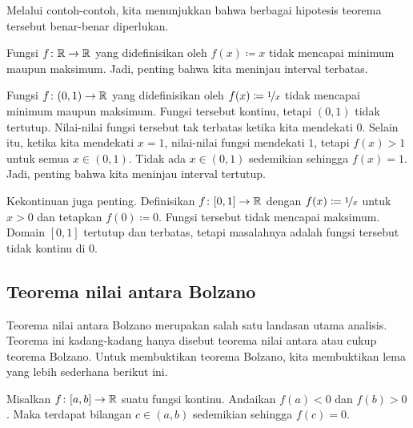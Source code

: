 Melalui contoh-contoh, kita menunjukkan bahwa berbagai hipotesis teorema tersebut
benar-benar diperlukan.

\begin{example}
Fungsi $f \colon {\mathbb{R}} \to {\mathbb{R}}$ yang didefinisikan oleh $f(x) \coloneqq x$
tidak mencapai minimum maupun maksimum.  Jadi, penting bahwa
kita meninjau interval terbatas.
\end{example}

\begin{example}
Fungsi $f \colon (0,1) \to {\mathbb{R}}$ yang didefinisikan oleh $f(x) \coloneqq \nicefrac{1}{x}$
tidak mencapai minimum maupun maksimum.
Fungsi tersebut kontinu, tetapi $(0,1)$ tidak tertutup.
Nilai-nilai fungsi tersebut
tak terbatas ketika kita mendekati $0$.  Selain itu, ketika kita mendekati $x=1$, nilai-nilai
fungsi mendekati $1$, tetapi $f(x) > 1$ untuk semua $x \in (0,1)$.  Tidak ada
$x \in (0,1)$ sedemikian sehingga $f(x) = 1$.  Jadi, penting bahwa
kita meninjau interval tertutup.
\end{example}

\begin{example}
Kekontinuan juga penting.
Definisikan $f \colon [0,1] \to {\mathbb{R}}$ dengan
$f(x) \coloneqq \nicefrac{1}{x}$ untuk $x > 0$ dan tetapkan $f(0) \coloneqq 0$.
Fungsi tersebut tidak mencapai maksimum.  Domain $[0,1]$ tertutup dan
terbatas, tetapi masalahnya adalah
fungsi tersebut tidak kontinu di 0.
\end{example}

\subsection{Teorema nilai antara Bolzano}

Teorema nilai antara Bolzano merupakan salah satu landasan utama analisis.
Teorema ini kadang-kadang hanya disebut teorema nilai antara atau cukup
teorema Bolzano.  Untuk membuktikan teorema Bolzano, kita membuktikan
lema yang lebih sederhana berikut ini.

\begin{lemma} \label{IVT:lemma}
Misalkan $f \colon [a,b] \to {\mathbb{R}}$ suatu fungsi kontinu.
Andaikan $f(a) < 0$ dan $f(b) > 0$.
Maka terdapat bilangan $c \in (a,b)$
sedemikian sehingga $f(c) = 0$.
\end{lemma}

